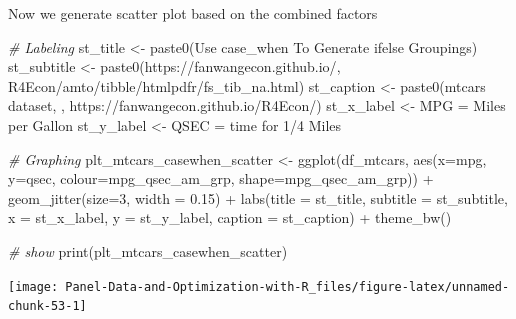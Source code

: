 \documentclass[
]{book}
\newenvironment{Shaded}{\begin{snugshade}}{\end{snugshade}}
\newcommand{\AttributeTok}[1]{\textcolor[rgb]{0.77,0.63,0.00}{#1}}
\newcommand{\CommentTok}[1]{\textcolor[rgb]{0.56,0.35,0.01}{\textit{#1}}}
\newcommand{\DecValTok}[1]{\textcolor[rgb]{0.00,0.00,0.81}{#1}}
\newcommand{\FloatTok}[1]{\textcolor[rgb]{0.00,0.00,0.81}{#1}}
\newcommand{\FunctionTok}[1]{\textcolor[rgb]{0.00,0.00,0.00}{#1}}
\newcommand{\NormalTok}[1]{#1}
\newcommand{\OtherTok}[1]{\textcolor[rgb]{0.56,0.35,0.01}{#1}}
\newcommand{\SpecialCharTok}[1]{\textcolor[rgb]{0.00,0.00,0.00}{#1}}
\newcommand{\StringTok}[1]{\textcolor[rgb]{0.31,0.60,0.02}{#1}}
\begin{document}
Now we generate scatter plot based on the combined factors

\begin{Shaded}
\begin{Highlighting}[]
\CommentTok{\# Labeling}
\NormalTok{st\_title }\OtherTok{\textless{}{-}} \FunctionTok{paste0}\NormalTok{(}\StringTok{\textquotesingle{}Use case\_when To Generate ifelse Groupings\textquotesingle{}}\NormalTok{)}
\NormalTok{st\_subtitle }\OtherTok{\textless{}{-}} \FunctionTok{paste0}\NormalTok{(}\StringTok{\textquotesingle{}https://fanwangecon.github.io/\textquotesingle{}}\NormalTok{,}
                      \StringTok{\textquotesingle{}R4Econ/amto/tibble/htmlpdfr/fs\_tib\_na.html\textquotesingle{}}\NormalTok{)}
\NormalTok{st\_caption }\OtherTok{\textless{}{-}} \FunctionTok{paste0}\NormalTok{(}\StringTok{\textquotesingle{}mtcars dataset, \textquotesingle{}}\NormalTok{,}
                     \StringTok{\textquotesingle{}https://fanwangecon.github.io/R4Econ/\textquotesingle{}}\NormalTok{)}
\NormalTok{st\_x\_label }\OtherTok{\textless{}{-}} \StringTok{\textquotesingle{}MPG = Miles per Gallon\textquotesingle{}}
\NormalTok{st\_y\_label }\OtherTok{\textless{}{-}} \StringTok{\textquotesingle{}QSEC = time for 1/4 Miles\textquotesingle{}}

\CommentTok{\# Graphing}
\NormalTok{plt\_mtcars\_casewhen\_scatter }\OtherTok{\textless{}{-}} 
  \FunctionTok{ggplot}\NormalTok{(df\_mtcars, }
         \FunctionTok{aes}\NormalTok{(}\AttributeTok{x=}\NormalTok{mpg, }\AttributeTok{y=}\NormalTok{qsec, }
             \AttributeTok{colour=}\NormalTok{mpg\_qsec\_am\_grp, }
             \AttributeTok{shape=}\NormalTok{mpg\_qsec\_am\_grp)) }\SpecialCharTok{+}
  \FunctionTok{geom\_jitter}\NormalTok{(}\AttributeTok{size=}\DecValTok{3}\NormalTok{, }\AttributeTok{width =} \FloatTok{0.15}\NormalTok{) }\SpecialCharTok{+}
  \FunctionTok{labs}\NormalTok{(}\AttributeTok{title =}\NormalTok{ st\_title, }\AttributeTok{subtitle =}\NormalTok{ st\_subtitle,}
       \AttributeTok{x =}\NormalTok{ st\_x\_label, }\AttributeTok{y =}\NormalTok{ st\_y\_label, }\AttributeTok{caption =}\NormalTok{ st\_caption) }\SpecialCharTok{+}
  \FunctionTok{theme\_bw}\NormalTok{()}

\CommentTok{\# show}
\FunctionTok{print}\NormalTok{(plt\_mtcars\_casewhen\_scatter)}
\end{Highlighting}
\end{Shaded}

\begin{center}\texttt{[image: Panel-Data-and-Optimization-with-R\_files/figure-latex/unnamed-chunk-53-1]} \end{center}
\end{document}
